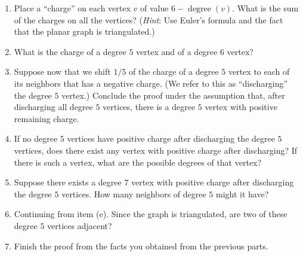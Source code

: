 \documentclass[11pt, notitlepage]{report}
\begin{document}
\begin{enumerate}
\item Place a ``charge'' on each vertex $v$ of value $6-\operatorname{degree}(v)$. What is
the sum of the charges on all the vertices?
(\textit{Hint}: Use Euler's formula and the fact that the planar graph is
triangulated.)


\item What is the charge of a degree $5$ vertex and of a degree $6$ vertex?


\item Suppose now that we shift $1/5$ of the charge of a degree $5$ vertex to each of its neighbors that has a negative charge.  (We refer to this as ``discharging'' the degree $5$ vertex.)  Conclude the proof under the assumption that, after discharging all degree $5$ vertices, there is a degree $5$ vertex with positive remaining charge.

\item If no degree $5$ vertices have positive charge after discharging the degree $5$ vertices, 
does there exist any vertex with positive charge after discharging?
If there is such a vertex, what are the possible degrees of that vertex?

\item 
Suppose there exists a degree $7$ vertex with positive charge after discharging the degree $5$ vertices.
How many neighbors of degree $5$ might it have?

\item Continuing from item (e). Since the graph is triangulated,
  are two of these degree $5$ vertices adjacent?

\item Finish the proof from the facts you obtained from the previous
  parts.



\end{enumerate}
\end{document}
